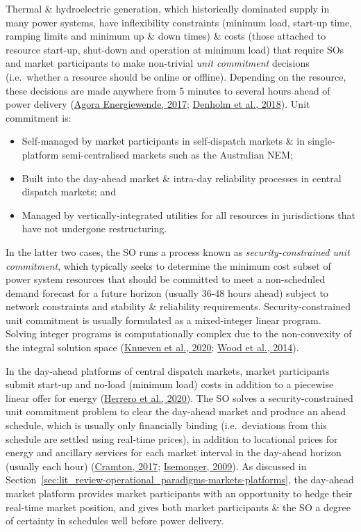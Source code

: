 \documentclass[12pt,a4paper,]{report}
\providecommand{\tightlist}{%
  \setlength{\itemsep}{0pt}\setlength{\parskip}{0pt}}
\begin{document}
Thermal \& hydroelectric generation, which historically dominated supply
in many power systems, have inflexibility constraints (minimum load,
start-up time, ramping limits and minimum up \& down times) \& costs
(those attached to resource start-up, shut-down and operation at minimum
load) that require SOs and market participants to make non-trivial
\emph{unit commitment} decisions (i.e.~whether a resource should be
online or offline). Depending on the resource, these decisions are made
anywhere from 5 minutes to several hours ahead of power delivery
(\protect\hyperlink{ref-agoraenergiewendeFlexibilityThermalPower2017}{Agora
Energiewende, 2017};
\protect\hyperlink{ref-denholmHowLowCan2018}{Denholm et al., 2018}).
Unit commitment is:

\begin{itemize}
\tightlist
\item
  Self-managed by market participants in self-dispatch markets \& in
  single-platform semi-centralised markets such as the Australian NEM;
\item
  Built into the day-ahead market \& intra-day reliability processes in
  central dispatch markets; and
\item
  Managed by vertically-integrated utilities for all resources in
  jurisdictions that have not undergone restructuring.
\end{itemize}

In the latter two cases, the SO runs a process known as
\emph{security-constrained unit commitment}, which typically seeks to
determine the minimum cost subset of power system resources that should
be committed to meet a non-scheduled demand forecast for a future
horizon (usually 36-48 hours ahead) subject to network constraints and
stability \& reliability requirements. Security-constrained unit
commitment is usually formulated as a mixed-integer linear program.
Solving integer programs is computationally complex due to the
non-convexity of the integral solution space
(\protect\hyperlink{ref-knuevenMixedintegerProgrammingFormulations2020}{Knueven
et al., 2020};
\protect\hyperlink{ref-woodPowerGenerationOperation2014}{Wood et al.,
2014}).

In the day-ahead platforms of central dispatch markets, market
participants submit start-up and no-load (minimum load) costs in
addition to a piecewise linear offer for energy
(\protect\hyperlink{ref-herreroEvolvingBiddingFormats2020}{Herrero et
al., 2020}). The SO solves a security-constrained unit commitment
problem to clear the day-ahead market and produce an ahead schedule,
which is usually only financially binding (i.e.~deviations from this
schedule are settled using real-time prices), in addition to locational
prices for energy and ancillary services for each market interval in the
day-ahead horizon (usually each hour)
(\protect\hyperlink{ref-cramtonElectricityMarketDesign2017}{Cramton,
2017}; \protect\hyperlink{ref-isemongerEvolvingDesignRTO2009}{Isemonger,
2009}). As discussed in
Section~\ref{sec:lit_review-operational_paradigms-markets-platforms},
the day-ahead market platform provides market participants with an
opportunity to hedge their real-time market position, and gives both
market participants \& the SO a degree of certainty in schedules well
before power delivery.
\end{document}
